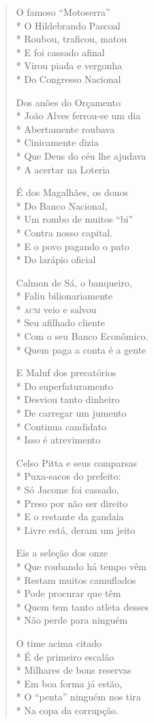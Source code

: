 \begin{verse}
O famoso “Motoserra”\\*
O Hildebrando Pascoal\\*
Roubou, traficou, matou\\*
E foi cassado afinal\\*
Virou piada e vergonha\\*
Do Congresso Nacional

Dos anões do Orçamento\\*
João Alves ferrou-se um dia\\*
Abertamente roubava\\*
Cinicamente dizia\\*
Que Deus do céu lhe ajudava\\*
A acertar na Loteria

É dos Magalhães, os donos\\*
Do Banco Nacional,\\*
Um rombo de muitos “bi”\\*
Contra nosso capital.\\*
E o povo pagando o pato\\*
Do larápio oficial

Calmon de Sá, o banqueiro,\\*
Faliu bilionariamente\\*
\textsc{acm} veio e salvou\\*
Seu afilhado cliente\\*
Com o seu Banco Econômico.\\*
Quem paga a conta é a gente

E Maluf dos precatórios\\*
Do superfaturamento\\*
Desviou tanto dinheiro\\*
De carregar um jumento\\*
Continua candidato\\*
Isso é atrevimento

Celso Pitta e seus comparsas\\*
Puxa-sacos do prefeito:\\*
Só Jacome foi cassado,\\*
Preso por não ser direito\\*
E o restante da gandaia\\*
Livre está, deram um jeito

Eis a seleção dos onze\\*
Que roubando há tempo vêm\\*
Restam muitos camuflados\\*
Pode procurar que têm\\*
Quem tem tanto atleta desses\\*
Não perde para ninguém

O time acima citado\\*
É de primeiro escalão\\*
Milhares de bons reservas\\*
Em boa forma já estão,\\*
O “penta” ninguém nos tira\\*
Na copa da corrupção.
\end{verse}


